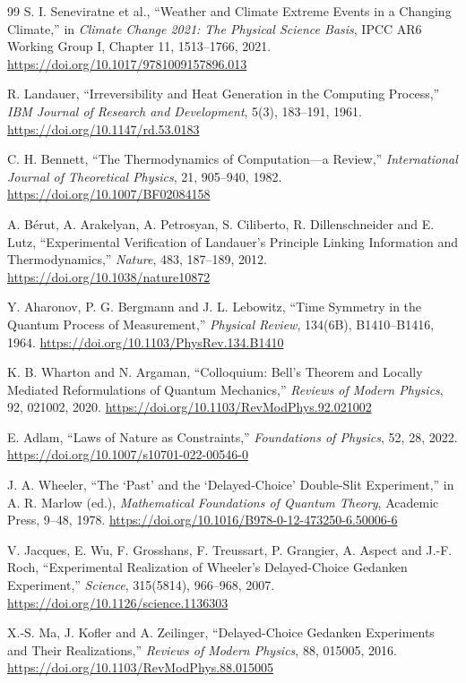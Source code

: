 \documentclass[11pt,a4paper]{article}
\theoremstyle{remark}
\begin{document}
\begin{thebibliography}{99}
S. I. Seneviratne et al.,
``Weather and Climate Extreme Events in a Changing Climate,''
in \emph{Climate Change 2021: The Physical Science Basis},
IPCC AR6 Working Group I, Chapter 11, 1513--1766, 2021.
\url{https://doi.org/10.1017/9781009157896.013}

R. Landauer,
``Irreversibility and Heat Generation in the Computing Process,''
\emph{IBM Journal of Research and Development}, 5(3), 183--191, 1961.
\url{https://doi.org/10.1147/rd.53.0183}

C. H. Bennett,
``The Thermodynamics of Computation---a Review,''
\emph{International Journal of Theoretical Physics}, 21, 905--940, 1982.
\url{https://doi.org/10.1007/BF02084158}

A. Bérut, A. Arakelyan, A. Petrosyan, S. Ciliberto, R. Dillenschneider and
E. Lutz,
``Experimental Verification of Landauer's Principle Linking Information and
Thermodynamics,''
\emph{Nature}, 483, 187--189, 2012.
\url{https://doi.org/10.1038/nature10872}

Y. Aharonov, P. G. Bergmann and J. L. Lebowitz,
``Time Symmetry in the Quantum Process of Measurement,''
\emph{Physical Review}, 134(6B), B1410--B1416, 1964.
\url{https://doi.org/10.1103/PhysRev.134.B1410}

K. B. Wharton and N. Argaman,
``Colloquium: Bell's Theorem and Locally Mediated Reformulations of Quantum
Mechanics,''
\emph{Reviews of Modern Physics}, 92, 021002, 2020.
\url{https://doi.org/10.1103/RevModPhys.92.021002}

E. Adlam,
``Laws of Nature as Constraints,''
\emph{Foundations of Physics}, 52, 28, 2022.
\url{https://doi.org/10.1007/s10701-022-00546-0}

J. A. Wheeler,
``The `Past' and the `Delayed-Choice' Double-Slit Experiment,''
in A. R. Marlow (ed.), \emph{Mathematical Foundations of Quantum Theory},
Academic Press, 9--48, 1978.
\url{https://doi.org/10.1016/B978-0-12-473250-6.50006-6}

V. Jacques, E. Wu, F. Grosshans, F. Treussart, P. Grangier, A. Aspect and
J.-F. Roch,
``Experimental Realization of Wheeler's Delayed-Choice Gedanken Experiment,''
\emph{Science}, 315(5814), 966--968, 2007.
\url{https://doi.org/10.1126/science.1136303}

X.-S. Ma, J. Kofler and A. Zeilinger,
``Delayed-Choice Gedanken Experiments and Their Realizations,''
\emph{Reviews of Modern Physics}, 88, 015005, 2016.
\url{https://doi.org/10.1103/RevModPhys.88.015005}


\end{thebibliography}
\end{document}
